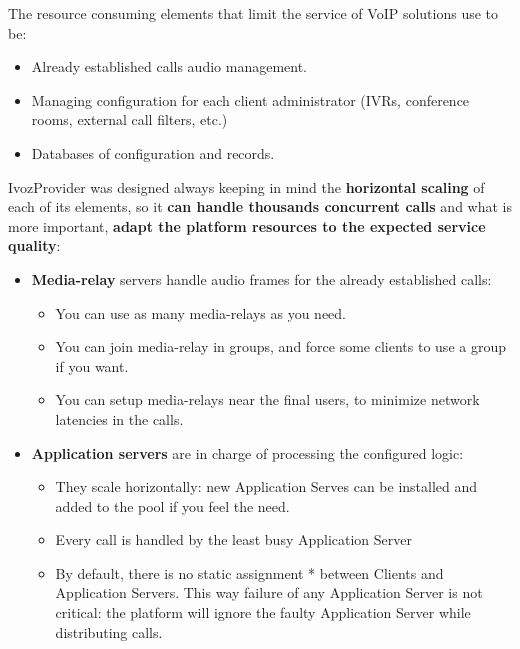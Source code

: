 \documentclass[letterpaper,10pt,spanish]{sphinxmanual}
\begin{document}
The resource consuming elements that limit the service of VoIP solutions
use to be:
\begin{itemize}
\item {} 
Already established calls audio management.

\item {} 
Managing configuration for each client administrator (IVRs, conference
rooms, external call filters, etc.)

\item {} 
Databases of configuration and records.

\end{itemize}

IvozProvider was designed always keeping in mind the \textbf{horizontal
scaling} of each of its elements, so it \textbf{can handle thousands concurrent calls}
and what is more important, \textbf{adapt the platform resources to the expected service quality}:
\begin{itemize}
\item {} 
\textbf{Media-relay} servers handle audio frames for the already established
calls:
\begin{itemize}
\item {} 
You can use as many media-relays as you need.

\item {} 
You can join media-relay in groups, and force some clients to use a
group if you want.

\item {} 
You can setup media-relays near the final users, to minimize network
latencies in the calls.

\end{itemize}

\item {} 
\textbf{Application servers} are in charge of processing the configured logic:
\begin{itemize}
\item {} 
They scale horizontally: new Application Serves can be installed and
added to the pool if you feel the need.

\item {} 
Every call is handled by the least busy Application Server

\item {} 
By default, there is no static assignment * between Clients and
Application Servers. This way failure of any Application Server is not
critical: the platform will ignore the faulty Application Server while
distributing calls.

\end{itemize}

\end{itemize}
\end{document}
